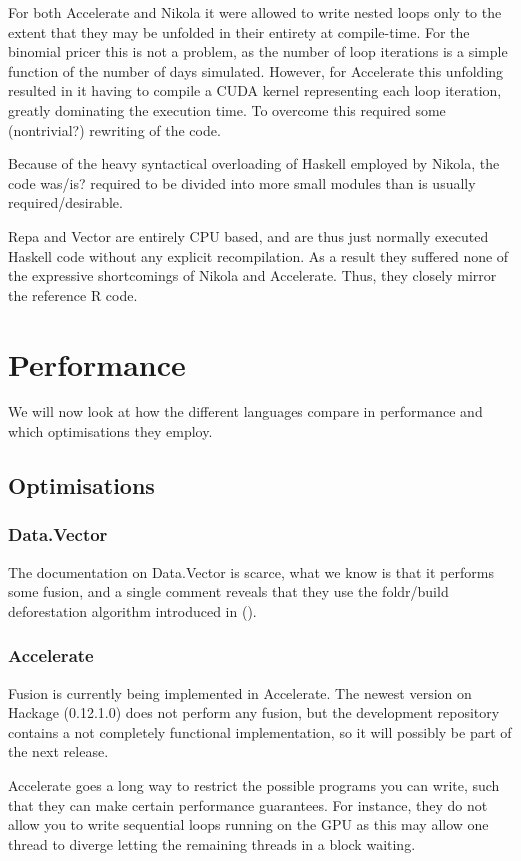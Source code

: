 For both Accelerate and Nikola it were allowed to write nested loops only to
the extent that they may be unfolded in their entirety at compile-time. For the
binomial pricer this is not a problem, as the number of loop iterations is a
simple function of the number of days simulated.   However, for Accelerate this unfolding resulted in it
having to compile a CUDA kernel representing each loop iteration, greatly
dominating the execution time. To overcome this required some (nontrivial?)
rewriting of the code.

Because of the heavy syntactical overloading of Haskell employed by Nikola, the
code was/is? required to be divided into more small modules than is usually
required/desirable.

Repa and Vector are entirely CPU based, and are thus just normally executed
Haskell code without any explicit recompilation. As a result they suffered none
of the expressive shortcomings of Nikola and Accelerate. Thus, they closely
mirror the reference R code.

\chapter{Performance}
We will now look at how the different languages compare in performance
and which optimisations they employ.

\section{Optimisations}

\subsection{Data.Vector}
The documentation on Data.Vector is scarce, what we know is that it
performs some fusion, and a single comment reveals that they use the
foldr/build deforestation algorithm introduced in ().

\subsection{Accelerate}
Fusion is currently being implemented in Accelerate. The newest
version on Hackage (0.12.1.0) does not perform any fusion, but the
development repository contains a not completely functional
implementation, so it will possibly be part of the next release.

Accelerate goes a long way to restrict the possible programs you can
write, such that they can make certain performance guarantees. For
instance, they do not allow you to write sequential loops running on
the GPU as this may allow one thread to diverge letting the remaining
threads in a block waiting.

